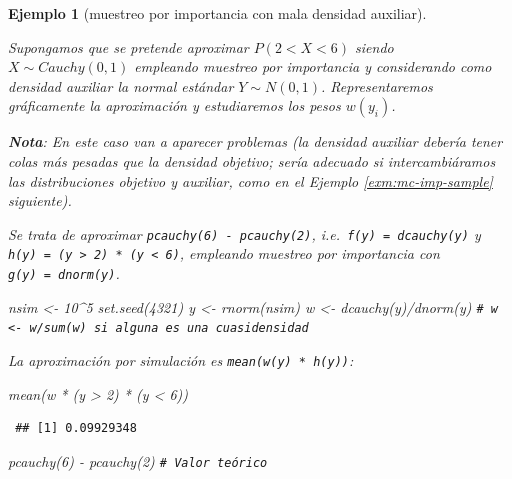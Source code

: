 \documentclass[
]{book}
\newenvironment{Shaded}{\begin{snugshade}}{\end{snugshade}}
\newcommand{\CommentTok}[1]{\textcolor[rgb]{0.56,0.35,0.01}{\textit{#1}}}
\newcommand{\DecValTok}[1]{\textcolor[rgb]{0.00,0.00,0.81}{#1}}
\newcommand{\FunctionTok}[1]{\textcolor[rgb]{0.00,0.00,0.00}{#1}}
\newcommand{\NormalTok}[1]{#1}
\newcommand{\OtherTok}[1]{\textcolor[rgb]{0.56,0.35,0.01}{#1}}
\newcommand{\SpecialCharTok}[1]{\textcolor[rgb]{0.00,0.00,0.00}{#1}}
\theoremstyle{break}
\newtheorem{example}{Ejemplo}[chapter]
\theoremstyle{nonumberplain}
\renewcommand{\CommentTok}[1]{\textcolor[rgb]{0.41,0.41,0.41}{\texttt{#1}}}
\begin{document}
\begin{example}[muestreo por importancia con mala densidad auxiliar]
\protect\hypertarget{exm:mc-imp2}{}\label{exm:mc-imp2}

Supongamos que se pretende aproximar \(P\left(2<X<6\right)\) siendo \(X\sim Cauchy(0,1)\) empleando muestreo por importancia y considerando como densidad auxiliar la normal estándar \(Y\sim N(0,1)\). Representaremos gráficamente la aproximación y estudiaremos los pesos \(w(y_i)\).

\textbf{Nota}: En este caso van a aparecer problemas
(la densidad auxiliar debería tener colas más pesadas que la densidad objetivo;
sería adecuado si intercambiáramos las distribuciones objetivo y auxiliar,
como en el Ejemplo \ref{exm:mc-imp-sample} siguiente).

Se trata de aproximar \texttt{pcauchy(6)\ -\ pcauchy(2)},
i.e.~\texttt{f(y)\ =\ dcauchy(y)} y \texttt{h(y)\ =\ (y\ \textgreater{}\ 2)\ *\ (y\ \textless{}\ 6)},
empleando muestreo por importancia con \texttt{g(y)\ =\ dnorm(y)}.

\begin{Shaded}
\begin{Highlighting}[]
\NormalTok{nsim }\OtherTok{\textless{}{-}} \DecValTok{10}\SpecialCharTok{\^{}}\DecValTok{5}
\FunctionTok{set.seed}\NormalTok{(}\DecValTok{4321}\NormalTok{)}
\NormalTok{y }\OtherTok{\textless{}{-}} \FunctionTok{rnorm}\NormalTok{(nsim)}
\NormalTok{w }\OtherTok{\textless{}{-}} \FunctionTok{dcauchy}\NormalTok{(y)}\SpecialCharTok{/}\FunctionTok{dnorm}\NormalTok{(y) }\CommentTok{\# w \textless{}{-} w/sum(w) si alguna es una cuasidensidad}
\end{Highlighting}
\end{Shaded}

La aproximación por simulación es \texttt{mean(w(y)\ *\ h(y))}:

\begin{Shaded}
\begin{Highlighting}[]
\FunctionTok{mean}\NormalTok{(w }\SpecialCharTok{*}\NormalTok{ (y }\SpecialCharTok{\textgreater{}} \DecValTok{2}\NormalTok{) }\SpecialCharTok{*}\NormalTok{ (y }\SpecialCharTok{\textless{}} \DecValTok{6}\NormalTok{)) }
\end{Highlighting}
\end{Shaded}

\begin{verbatim}
 ## [1] 0.09929348
\end{verbatim}

\begin{Shaded}
\begin{Highlighting}[]
\FunctionTok{pcauchy}\NormalTok{(}\DecValTok{6}\NormalTok{) }\SpecialCharTok{{-}} \FunctionTok{pcauchy}\NormalTok{(}\DecValTok{2}\NormalTok{)  }\CommentTok{\# Valor teórico}
\end{Highlighting}
\end{Shaded}


\end{example}
\end{document}
